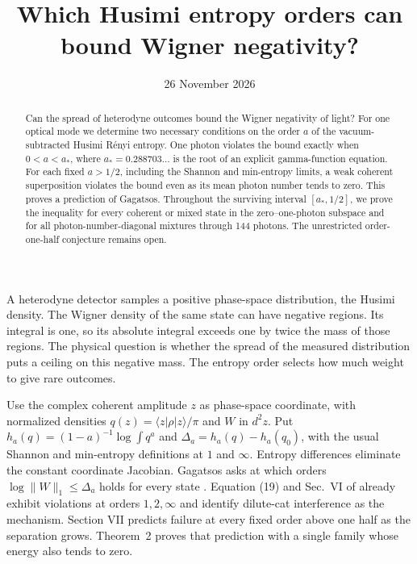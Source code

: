 \documentclass[11pt]{article}
\title{Which Husimi entropy orders can bound Wigner negativity?}
\date{26 November 2026}
\newcommand{\D}{\Delta}
\begin{document}
\maketitle
\begin{abstract}
Can the spread of heterodyne outcomes bound the Wigner negativity of light? For one optical mode we determine two necessary conditions on the order $a$ of the vacuum-subtracted Husimi R\'enyi entropy. One photon violates the bound exactly when $0<a<a_*$, where $a_*=0.288703\ldots$ is the root of an explicit gamma-function equation. For each fixed $a>1/2$, including the Shannon and min-entropy limits, a weak coherent superposition violates the bound even as its mean photon number tends to zero. This proves a prediction of Gagatsos. Throughout the surviving interval $[a_*,1/2]$, we prove the inequality for every coherent or mixed state in the zero--one-photon subspace and for all photon-number-diagonal mixtures through 144 photons. The unrestricted order-one-half conjecture remains open.
\end{abstract}

A heterodyne detector samples a positive phase-space distribution, the Husimi density. The Wigner density of the same state can have negative regions. Its integral is one, so its absolute integral exceeds one by twice the mass of those regions. The physical question is whether the spread of the measured distribution puts a ceiling on this negative mass. The entropy order selects how much weight to give rare outcomes.

Use the complex coherent amplitude $z$ as phase-space coordinate, with normalized densities $q(z)=\langle z|\rho|z\rangle/\pi$ and $W$ in $d^2z$. Put $h_a(q)=(1-a)^{-1}\log\int q^a$ and $\D_a=h_a(q)-h_a(q_0)$, with the usual Shannon and min-entropy definitions at $1$ and $\infty$. Entropy differences eliminate the constant coordinate Jacobian. Gagatsos asks at which orders $\log\|W\|_1\le\D_a$ holds for every state \cite{gag}. Equation (19) and Sec.~VI of \cite{gag} already exhibit violations at orders $1,2,\infty$ and identify dilute-cat interference as the mechanism. Section VII predicts failure at every fixed order above one half as the separation grows. Theorem~2 proves that prediction with a single family whose energy also tends to zero.
\end{document}
